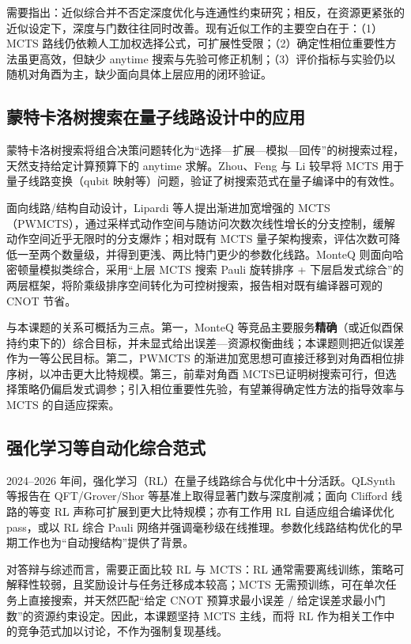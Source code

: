 \documentclass{HDU-Bachelor-Thesis}
\begin{document}
需要指出：近似综合并不否定深度优化与连通性约束研究；相反，在资源更紧张的近似设定下，深度与门数往往同时改善。现有近似工作的主要空白在于：（1）MCTS 路线仍依赖人工加权选择公式，可扩展性受限；（2）确定性相位重要性方法虽更高效，但缺少 anytime 搜索与先验可修正机制；（3）评价指标与实验仍以随机对角酉为主，缺少面向具体上层应用的闭环验证。

\subsection{蒙特卡洛树搜索在量子线路设计中的应用}

蒙特卡洛树搜索将组合决策问题转化为“选择—扩展—模拟—回传”的树搜索过程，天然支持给定计算预算下的 anytime 求解。Zhou、Feng 与 Li 较早将 MCTS 用于量子线路变换（qubit 映射等）问题，验证了树搜索范式在量子编译中的有效性\cite{zhou2020mcts}。

面向线路/结构自动设计，Lipardi 等人提出渐进加宽增强的 MCTS（PWMCTS），通过采样式动作空间与随访问次数次线性增长的分支控制，缓解动作空间近乎无限时的分支爆炸；相对既有 MCTS 量子架构搜索，评估次数可降低一至两个数量级，并得到更浅、两比特门更少的参数化线路\cite{lipardi2025pwmcts}。MonteQ 则面向哈密顿量模拟类综合，采用“上层 MCTS 搜索 Pauli 旋转排序 + 下层启发式综合”的两层框架，将阶乘级排序空间转化为可控树搜索，报告相对既有编译器可观的 CNOT 节省\cite{monteq2026}。

与本课题的关系可概括为三点。第一，MonteQ 等竞品主要服务\textbf{精确}（或近似酉保持约束下的）综合目标，并未显式给出误差—资源权衡曲线；本课题则把近似误差作为一等公民目标。第二，PWMCTS 的渐进加宽思想可直接迁移到对角酉相位排序树，以冲击更大比特规模。第三，前辈对角酉 MCTS\cite{nisq-mcts-thesis}已证明树搜索可行，但选择策略仍偏启发式调参；引入相位重要性先验，有望兼得确定性方法的指导效率与 MCTS 的自适应探索。

\subsection{强化学习等自动化综合范式}

2024--2026 年间，强化学习（RL）在量子线路综合与优化中十分活跃。QLSynth 等报告在 QFT/Grover/Shor 等基准上取得显著门数与深度削减\cite{qlsynth2025}；面向 Clifford 线路的等变 RL 声称可扩展到更大比特规模\cite{equivariant-rl-clifford2026}；亦有工作用 RL 自适应组合编译优化 pass\cite{rl-pass-composition2026}，或以 RL 综合 Pauli 网络并强调毫秒级在线推理\cite{pauli-network-rl2025}。参数化线路结构优化的早期工作也为“自动搜结构”提供了背景\cite{ostaszewski2019structure}。

对答辩与综述而言，需要正面比较 RL 与 MCTS：RL 通常需要离线训练，策略可解释性较弱，且奖励设计与任务迁移成本较高；MCTS 无需预训练，可在单次任务上直接搜索，并天然匹配“给定 CNOT 预算求最小误差 / 给定误差求最小门数”的资源约束设定。因此，本课题坚持 MCTS 主线，而将 RL 作为相关工作中的竞争范式加以讨论，不作为强制复现基线。
\end{document}
